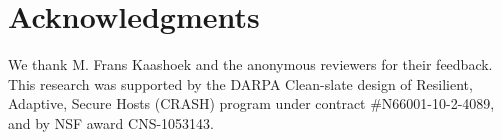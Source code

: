 \section*{Acknowledgments}

We thank M. Frans Kaashoek and the anonymous reviewers for their feedback.
This research was supported by the DARPA Clean-slate design of Resilient,
Adaptive, Secure Hosts (CRASH) program under contract \#N66001-10-2-4089,
and by NSF award CNS-1053143.

